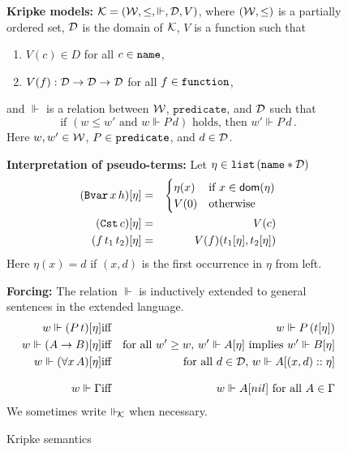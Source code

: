 \documentclass{svjour3}                     %
\newcommand{\cald}{{\cal D}}
\newcommand{\calk}{{\cal K}}
\newcommand{\calw}{{\cal W}}
\newcommand{\Ga}{\Gamma}
\newcommand{\Vd}{\Vdash}
\newcommand{\dom}{\mathrm{\textsf{dom}}}
\newcommand{\tBvar}{\textup{\tt Bvar}}
\newcommand{\tCst}{\textup{\tt Cst}}
\newcommand{\tnat}{\textup{\tt name}}
\newcommand{\tfunction}{\textup{\tt function}}
\newcommand{\tpredicate}{\textup{\tt predicate}}
\newcommand{\tlist}{\textup{\tt list}}
\begin{document}
\begin{figure}[t]
\textbf{Kripke models:} $\calk = (\calw, \le,\Vd , \cald, V )$, where $(\calw, \le)$ is a partially ordered set, $\cald$ is the domain of $\calk$, $V$ is a function such that
\begin{enumerate}
\item $V(c) \in D$ for all $c \in \tnat$,
\item $V(f) : \cald \to \cald \to \cald$ for all $f \in \tfunction$,
\end{enumerate}
and $\Vd$ is a relation between $\calw$, $\texttt{predicate}$, and $\cald$
such that
\[
\text{if}\,\, (w \le w' \text{ and } w \Vd P\,
d)\,\,\text{holds,}
\,\,\text{then}\,\, w' \Vd P\,d\,.
\]
Here $w, w' \in \calw$, $P \in \tpredicate$, and $d \in \cald$.\medskip

\textbf{Interpretation of pseudo-terms:} Let $\eta \in \tlist\, (\tnat \ast \cald)$
\begin{eqnarray}
  (\tBvar\, x\, h) [\eta] & = &
  \begin{cases}
    \eta(x) & \text{if } x\in \dom(\eta)\\
    V(0) & \text{otherwise}
  \end{cases}\nonumber\\
  (\tCst\, c) [\eta] & = & V(c) \label{kripke-cst}\\
  (f\, t_1\, t_2 ) [\eta] & = & V(f)(t_1 [\eta], t_2 [\eta])\nonumber
\end{eqnarray}
Here $\eta(x) = d$ if $(x,d)$ is the first occurrence in $\eta$ from left.\medskip

\textbf{Forcing:} The relation $\Vd$ is inductively extended to general sentences in the extended language.
\begin{eqnarray}
  w \Vd (P\, t)[\eta] & \text{iff} & w \Vd P\, (t[\eta]) \nonumber\\
  w \Vd (A \to B)[\eta] & \text{iff} & \text{for all $w' \ge w$, $w' \Vd A [\eta]$ implies $w' \Vd B[\eta]$} \nonumber\\
  w \Vd (\forall x\,  A)[\eta] & \text{iff} & \text{for all $d \in \cald$, $w\Vd A [(x, d) :: \eta]$} \label{kripke-all} \\[2ex]
  w \Vd \Ga & \text{iff} & \text{$w \Vd A [nil]$ for all $A \in \Ga$} \nonumber
\end{eqnarray}
We sometimes write $\Vd_{\!\calk}$ when necessary.

\hrulefill
  \caption{Kripke semantics}
  \label{fig:kripke}
\end{figure}
\end{document}
